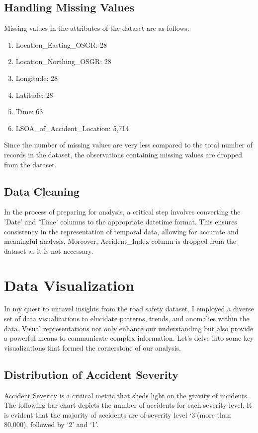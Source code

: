 \documentclass{article}
\begin{document}
\subsection{Handling Missing Values}
Missing values in the attributes of the dataset are as follows:
\begin{enumerate}
  \item Location\_Easting\_OSGR: 28
  \item Location\_Northing\_OSGR: 28
  \item Longitude: 28
  \item Latitude: 28
  \item Time: 63
  \item LSOA\_of\_Accident\_Location: 5,714
\end{enumerate}
Since the number of missing values are very less compared to the total number of records in the dataset, the
observations containing missing values are dropped from the dataset.

\subsection{Data Cleaning}
In the process of preparing for analysis, a critical step involves converting the 'Date'  and 'Time' columns to
the appropriate datetime format. This ensures consistency in the representation of temporal  data, allowing for
accurate and meaningful analysis. Moreover, Accident\_Index column is dropped from the dataset as it is not
necessary.

\section{Data Visualization}
In my quest to unravel insights from the road safety dataset, I employed a diverse set of data visualizations to
elucidate patterns, trends, and anomalies within the data. Visual representations not only enhance our understanding
but also provide a powerful means to communicate complex information. Let's delve into some key visualizations that
formed the cornerstone of our analysis.

\subsection{Distribution of Accident Severity}
Accident Severity is a critical metric that sheds light on the gravity of incidents. The following bar chart depicts
the number of accidents for each severity level. It is evident that the majority of accidents are of severity level
`3'(more than 80,000), followed by `2' and `1'.
\end{document}
